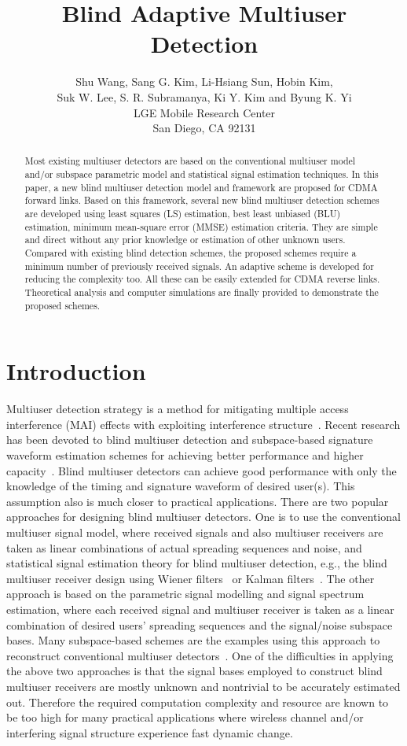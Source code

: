 \documentclass[a4paper,10pt,fleqn, twocolumn]{IEEETran}
\title{Blind Adaptive Multiuser Detection}
\author{Shu Wang, Sang G. Kim, Li-Hsiang Sun, Hobin Kim,\\
   Suk W. Lee, S. R. Subramanya, Ki Y. Kim and Byung K. Yi\\ LGE Mobile Research
Center\\San Diego, CA 92131}
\date{}
\begin{document}
\maketitle
\begin{abstract}\small
Most existing multiuser detectors are based on the conventional
multiuser model and/or subspace parametric model and statistical
signal estimation techniques. In this paper, a new blind multiuser
detection model and framework are proposed for CDMA forward links.
Based on this framework, several new blind multiuser detection
schemes are developed using least squares (LS) estimation, best
least unbiased (BLU) estimation, minimum mean-square error (MMSE)
estimation criteria. They are simple and direct without any prior
knowledge or estimation of other unknown users. Compared with
existing blind detection schemes, the proposed schemes require a
minimum number of previously received signals. An adaptive scheme
is developed for reducing the complexity too. All these can be
easily extended for CDMA reverse links. Theoretical analysis and
computer simulations are finally provided to demonstrate the
proposed schemes.
\end{abstract}
\section{Introduction}
Multiuser detection strategy is a method for mitigating multiple
access interference (MAI) effects with exploiting interference
structure~\cite{Verd98}. Recent research has been devoted to blind
multiuser detection and subspace-based signature waveform
estimation schemes for achieving better performance and higher
capacity~\cite{Madh94,Honi95,Poor97,Wang98,Torl97,Liu96}. Blind
multiuser detectors can achieve good performance with only the
knowledge of the timing and signature waveform of desired user(s).
This assumption also is much closer to practical applications.
There are two popular approaches for designing blind multiuser
detectors. One is to use the conventional multiuser signal model,
where received signals and also multiuser receivers are taken as
linear combinations of actual spreading sequences and noise, and
statistical signal estimation theory for blind multiuser
detection, e.g., the blind multiuser receiver design using Wiener
filters~\cite{Honi95} or Kalman filters~\cite{Zhang02}. The other
approach is based on the parametric signal modelling and signal
spectrum estimation, where each received signal and multiuser
receiver is taken as a linear combination of desired users'
spreading sequences and the signal/noise subspace bases. Many
subspace-based schemes are the examples using this approach to
reconstruct conventional multiuser
detectors~\cite{Wang98,Yang95,Wang99}. One of the difficulties in
applying the above two approaches is that the signal bases
employed to construct blind multiuser receivers are mostly unknown
and nontrivial to be accurately estimated out. Therefore the
required computation complexity and resource are known to be too
high for many practical applications where wireless channel and/or
interfering signal structure experience fast dynamic change.
\end{document}
